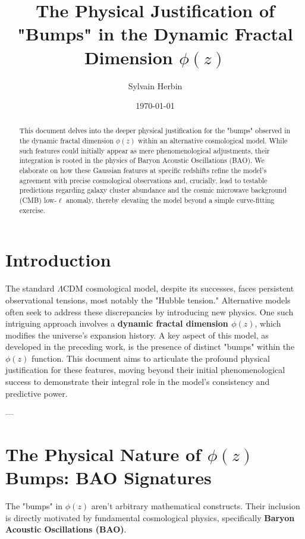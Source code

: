 \documentclass{article}
\title{The Physical Justification of "Bumps" in the Dynamic Fractal Dimension $\phi(z)$}
\author{Sylvain Herbin\orcidlink{0009-0001-3390-5012}}
\date{\today}
\begin{document}
\maketitle

\begin{abstract}
This document delves into the deeper physical justification for the "bumps" observed in the dynamic fractal dimension $\phi(z)$ within an alternative cosmological model. While such features could initially appear as mere phenomenological adjustments, their integration is rooted in the physics of Baryon Acoustic Oscillations (BAO). We elaborate on how these Gaussian features at specific redshifts refine the model's agreement with precise cosmological observations and, crucially, lead to testable predictions regarding galaxy cluster abundance and the cosmic microwave background (CMB) low-$\ell$ anomaly, thereby elevating the model beyond a simple curve-fitting exercise.
\end{abstract}

\tableofcontents
\newpage

\section{Introduction}
The standard $\Lambda$CDM cosmological model, despite its successes, faces persistent observational tensions, most notably the "Hubble tension." Alternative models often seek to address these discrepancies by introducing new physics. One such intriguing approach involves a \textbf{dynamic fractal dimension $\phi(z)$}, which modifies the universe's expansion history. A key aspect of this model, as developed in the preceding work, is the presence of distinct "bumps" within the $\phi(z)$ function. This document aims to articulate the profound physical justification for these features, moving beyond their initial phenomenological success to demonstrate their integral role in the model's consistency and predictive power.

---

\section{The Physical Nature of $\phi(z)$ Bumps: BAO Signatures}

The "bumps" in $\phi(z)$ aren't arbitrary mathematical constructs. Their inclusion is directly motivated by fundamental cosmological physics, specifically \textbf{Baryon Acoustic Oscillations (BAO)}.
\end{document}
